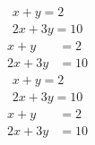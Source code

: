 \documentclass{article}
\begin{document}
\begin{gather}
x+y=2\\
2x+3y=10
\end{gather}
\begin{align}
x+y&=2\\
2x+3y&=10
\end{align}
\begin{gather*}
x+y=2\\
2x+3y=10
\end{gather*}
\begin{align*}
x+y&=2\\
2x+3y&=10
\end{align*}
\end{document}
